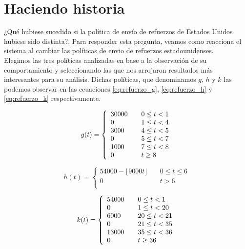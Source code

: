 \documentclass{sig-alternate}
\begin{document}
\newpage

\section{Haciendo historia}
\label{sec:history}
¿Qué hubiese sucedido si la política de envío de refuerzos de Estados Unidos hubiese sido distinta?. Para responder esta pregunta, veamos como
reacciona el sistema al cambiar las políticas de envio de refuerzos estadounidenses.\\
Elegimos las tres políticas analizadas en base a la observación de su comportamiento y seleccionando las que nos arrojaron resultados
más interesantes para su análisis. Dichas políticas, que denominamos $g$, $h$ y $k$ las podemos observar en las ecuaciones \eqref{eq:refuerzo_g}, 
\eqref{eq:refuerzo_h} y \eqref{eq:refuerzo_k} respectivamente.

\begin{equation}
g(t) = \left\{ 
    \begin{array}{l l}
    30000 & \quad 0 \leq t < 1 \\
    0 & \quad 1 \leq t < 4\\
    3000 & \quad 4 \leq t < 5\\
    0 & \quad 5 \leq t < 7\\
    1000 & \quad 7 \leq t < 8\\
    0 & \quad t \geq 8\\
    \end{array} \right.
\label{eq:refuerzo_g}
\end{equation}

\begin{equation}
h(t) = \left\{ 
    \begin{array}{ll}
    54000 - \lfloor 9000t \rfloor & \quad 0 \leq t \leq 6 \\
    0 & \quad t > 6\\
    \end{array} \right.
\label{eq:refuerzo_h}
\end{equation}

\begin{equation}
k(t) = \left\{ 
    \begin{array}{l l}
    54000 & \quad 0 \leq t < 1 \\
    0 & \quad 1 \leq t < 20\\
    6000 & \quad 20 \leq t < 21\\
    0 & \quad 21 \leq t < 35\\
    13000 & \quad 35 \leq t < 36\\
    0 & \quad t \geq 36\\
    \end{array} \right.
\label{eq:refuerzo_k}
\end{equation}
\end{document}
